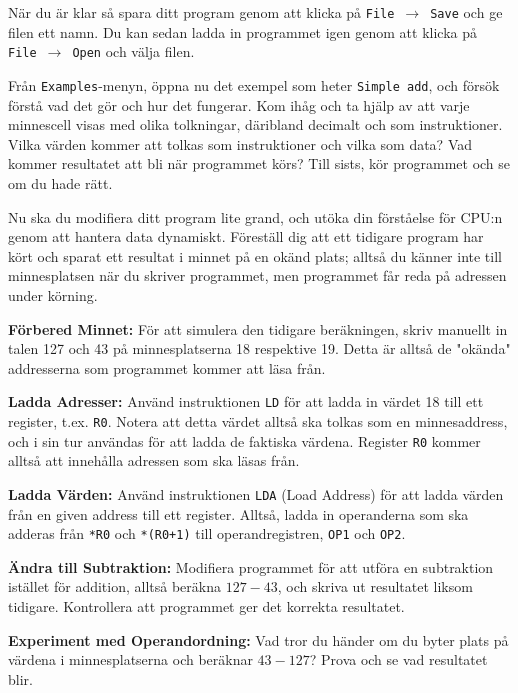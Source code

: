 \begin{Datorarbete}
    När du är klar så spara ditt program genom att klicka på \texttt{File}~$\rightarrow$~\texttt{Save} och ge filen ett namn. Du kan sedan ladda in programmet igen genom att klicka på \texttt{File}~$\rightarrow$~\texttt{Open} och välja filen.
    \vspace{-2mm}

    \item {} Från \texttt{Examples}-menyn, öppna nu det exempel som heter \texttt{Simple~add}, och försök förstå vad det gör och hur det fungerar. Kom ihåg och ta hjälp av att varje minnescell visas med olika tolkningar, däribland decimalt och som instruktioner. Vilka värden kommer att tolkas som instruktioner och vilka som data? Vad kommer resultatet att bli när programmet körs? Till sists, kör programmet och se om du hade rätt.
    
    \newpage

    \item {} Nu ska du modifiera ditt program lite grand, och utöka din förståelse för CPU:n genom att hantera data dynamiskt. Föreställ dig att ett tidigare program har kört och sparat ett resultat i minnet på en okänd plats; alltså du känner inte till minnesplatsen när du skriver programmet, men programmet får reda på adressen under körning.

    \begin{Deluppgifter}
        \item \textbf{Förbered Minnet:} För att simulera den tidigare beräkningen, skriv manuellt in talen 127 och 43 på minnesplatserna 18 respektive 19. Detta är alltså de "okända" addresserna som programmet kommer att läsa från.
        \item \textbf{Ladda Adresser:} Använd instruktionen \texttt{LD} för att ladda in värdet 18 till ett register, t.ex. \texttt{R0}. Notera att detta värdet alltså ska tolkas som en minnesaddress, och i sin tur användas för att ladda de faktiska värdena. Register \texttt{R0} kommer alltså att innehålla adressen som ska läsas från.
        \item \textbf{Ladda Värden:} Använd instruktionen \texttt{LDA} (Load Address) för att ladda värden från en given address till ett register. Alltså, ladda in operanderna som ska adderas från \texttt{*R0} och \texttt{*(R0+1)} till operandregistren, \texttt{OP1} och \texttt{OP2}.
        \item \textbf{Ändra till Subtraktion:} Modifiera programmet för att utföra en subtraktion istället för addition, alltså beräkna \(127-43\), och skriva ut resultatet liksom tidigare. Kontrollera att programmet ger det korrekta resultatet.
        \item \textbf{Experiment med Operandordning:} Vad tror du händer om du byter plats på värdena i minnesplatserna och beräknar \(43-127\)? Prova och se vad resultatet blir.
    \end{Deluppgifter}


\end{Datorarbete}
